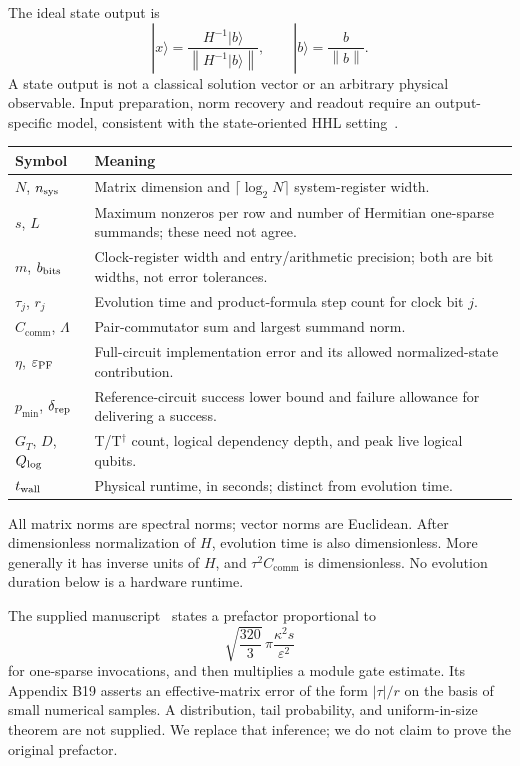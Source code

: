\documentclass[11pt,a4paper]{article}
\newcommand{\norm}[1]{\left\lVert #1\right\rVert}
\newcommand{\C}{C_{\mathrm{comm}}}
\newcommand{\eps}{\varepsilon}
\begin{document}
The ideal state output is
\begin{equation}
 |x\rangle=\frac{H^{-1}|b\rangle}{\norm{H^{-1}|b\rangle}},\qquad |b\rangle=\frac{b}{\norm b}.
\end{equation}
A state output is not a classical solution vector or an arbitrary physical observable. Input preparation, norm recovery and readout require an output-specific model, consistent with the state-oriented HHL setting~\cite{hhl}.

\begin{center}
\begin{tabular}{p{.20\linewidth}p{.72\linewidth}}
\toprule Symbol & Meaning \\\midrule
$N$, $n_{\rm sys}$ & Matrix dimension and $\lceil\log_2 N\rceil$ system-register width.\\
$s$, $L$ & Maximum nonzeros per row and number of Hermitian one-sparse summands; these need not agree.\\
$m$, $b_{\rm bits}$ & Clock-register width and entry/arithmetic precision; both are bit widths, not error tolerances.\\
$\tau_j$, $r_j$ & Evolution time and product-formula step count for clock bit $j$.\\
$\C$, $\Lambda$ & Pair-commutator sum and largest summand norm.\\
$\eta$, $\eps_{\rm PF}$ & Full-circuit implementation error and its allowed normalized-state contribution.\\
$p_{\min}$, $\delta_{\rm rep}$ & Reference-circuit success lower bound and failure allowance for delivering a success.\\
$G_T$, $D$, $Q_{\rm log}$ & T/T$^\dagger$ count, logical dependency depth, and peak live logical qubits.\\
$t_{\rm wall}$ & Physical runtime, in seconds; distinct from evolution time.\\
\bottomrule
\end{tabular}
\end{center}
All matrix norms are spectral norms; vector norms are Euclidean. After dimensionless normalization of $H$, evolution time is also dimensionless. More generally it has inverse units of $H$, and $\tau^2\C$ is dimensionless. No evolution duration below is a hardware runtime.

The supplied manuscript~\cite{manuscript} states a prefactor proportional to
\begin{equation}\label{eq:old}
 \sqrt{\frac{320}{3}}\,\pi\frac{\kappa^2s}{\eps^2}
\end{equation}
for one-sparse invocations, and then multiplies a module gate estimate. Its Appendix B19 asserts an effective-matrix error of the form $|\tau|/r$ on the basis of small numerical samples. A distribution, tail probability, and uniform-in-size theorem are not supplied. We replace that inference; we do not claim to prove the original prefactor.
\end{document}
